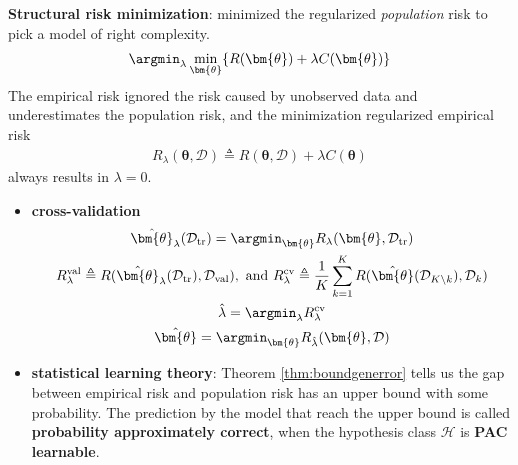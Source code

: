 \textbf{Structural risk minimization}: minimized the regularized \textit{population} risk to pick a model of right complexity.
\begin{gather}
    \argmin_\lambda\min_{\bm{\theta}}\{R(\bm{\theta})+\lambda C(\bm{\theta})\}
\end{gather}
The empirical risk ignored the risk caused by unobserved data and underestimates the population risk,
and the minimization regularized empirical risk 
\begin{gather}
    R_\lambda(\bm{\theta},\mathcal{D})\triangleq R(\bm{\theta},\mathcal{D})+\lambda C(\bm{\theta})
\end{gather} 
always results in $\lambda=0$.
\begin{itemize}
    \item \textbf{cross-validation}
    \begin{gather}
        \hat{\bm{\theta}}_\lambda(\mathcal{D}_\text{tr})=\argmin_{\bm{\theta}}R_\lambda(\bm{\theta},\mathcal{D}_\text{tr}) \\
        R_\lambda^\text{val}\triangleq R(\hat{\bm{\theta}}_\lambda(\mathcal{D}_\text{tr}),\mathcal{D}_\text{val}),~\text{and}~
        R_\lambda^\text{cv}\triangleq\frac{1}{K}\sum_{k=1}^K{R(\hat{\bm{\theta}}(\mathcal{D}_{K\setminus k}),\mathcal{D}_k)} \\
        \hat{\lambda}=\argmin_\lambda R_\lambda^\text{cv} \\
        \hat{\bm{\theta}}=\argmin_{\bm{\theta}}R_{\hat{\lambda}}(\bm{\theta},\mathcal{D})
    \end{gather}
    \item \textbf{statistical learning theory}: Theorem \ref{thm:boundgenerror} tells us the gap between 
    empirical risk and population risk has an upper bound with some probability. 
    The prediction by the model that reach the upper bound is called \textbf{probability approximately correct},
    when the hypothesis class $\mathcal{H}$ is \textbf{PAC learnable}. 
\end{itemize}

